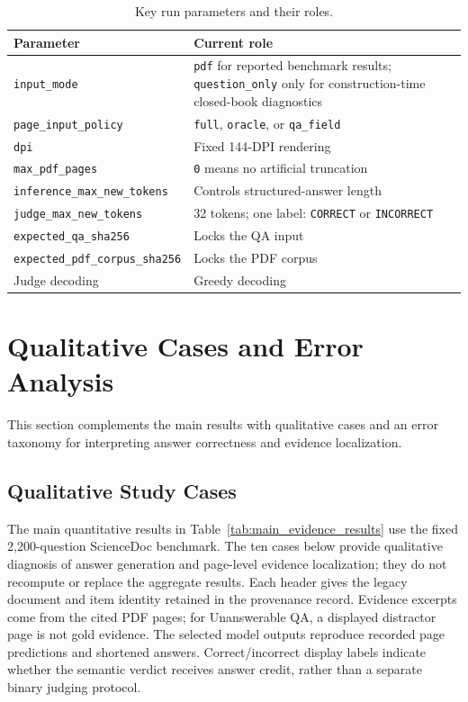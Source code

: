 \documentclass{article} %
\begin{document}
\begin{table}[!htb]
\centering
\caption{Key run parameters and their roles.}
\label{tab:app_run_config}
\small
\begin{tabularx}{\linewidth}{l X}
\toprule
\textbf{Parameter} & \textbf{Current role} \\
\midrule
\texttt{input\_\allowbreak mode} & \texttt{pdf} for reported benchmark results; \texttt{question\_\allowbreak only} only for construction-time closed-book diagnostics \\
\texttt{page\_\allowbreak input\_\allowbreak policy} & \texttt{full}, \texttt{oracle}, or \texttt{qa\_\allowbreak field} \\
\texttt{dpi} & Fixed 144-DPI rendering \\
\texttt{max\_\allowbreak pdf\_\allowbreak pages} & \texttt{0} means no artificial truncation \\
\texttt{inference\_\allowbreak max\_\allowbreak new\_\allowbreak tokens} & Controls structured-answer length \\
\texttt{judge\_\allowbreak max\_\allowbreak new\_\allowbreak tokens} & 32 tokens; one label: \texttt{CORRECT} or \texttt{INCORRECT} \\
\texttt{expected\_\allowbreak qa\_\allowbreak sha256} & Locks the QA input \\
\texttt{expected\_\allowbreak pdf\_\allowbreak corpus\_\allowbreak sha256} & Locks the PDF corpus \\
Judge decoding & Greedy decoding \\
\bottomrule
\end{tabularx}
\end{table}

\FloatBarrier

\section{Qualitative Cases and Error Analysis}
\label{app:qualitative_analysis}

This section complements the main results with qualitative cases and an error taxonomy for interpreting answer correctness and evidence localization.

\subsection{Qualitative Study Cases}
\label{app:study_cases}

The main quantitative results in Table~\ref{tab:main_evidence_results} use the fixed 2,200-question ScienceDoc benchmark. The ten cases below provide qualitative diagnosis of answer generation and page-level evidence localization; they do not recompute or replace the aggregate results. Each header gives the legacy document and item identity retained in the provenance record. Evidence excerpts come from the cited  PDF pages; for Unanswerable QA, a displayed distractor page is not gold evidence. The selected model outputs reproduce recorded page predictions and shortened answers. Correct/incorrect display labels indicate whether the semantic verdict receives answer credit, rather than a separate binary judging protocol.
\end{document}
